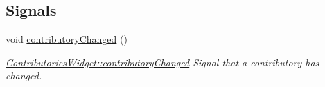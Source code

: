 \subsection*{Signals}
\begin{DoxyCompactItemize}
\item 
\hypertarget{classGui_1_1Widgets_1_1ContributoriesWidget_a510bfd755cf271fd10b63cf68284cd02}{void \hyperlink{classGui_1_1Widgets_1_1ContributoriesWidget_a510bfd755cf271fd10b63cf68284cd02}{contributory\-Changed} ()}\label{classGui_1_1Widgets_1_1ContributoriesWidget_a510bfd755cf271fd10b63cf68284cd02}

\begin{DoxyCompactList}\small\item\em \hyperlink{classGui_1_1Widgets_1_1ContributoriesWidget_a510bfd755cf271fd10b63cf68284cd02}{Contributories\-Widget\-::contributory\-Changed} Signal that a contributory has changed. \end{DoxyCompactList}\end{DoxyCompactItemize}
